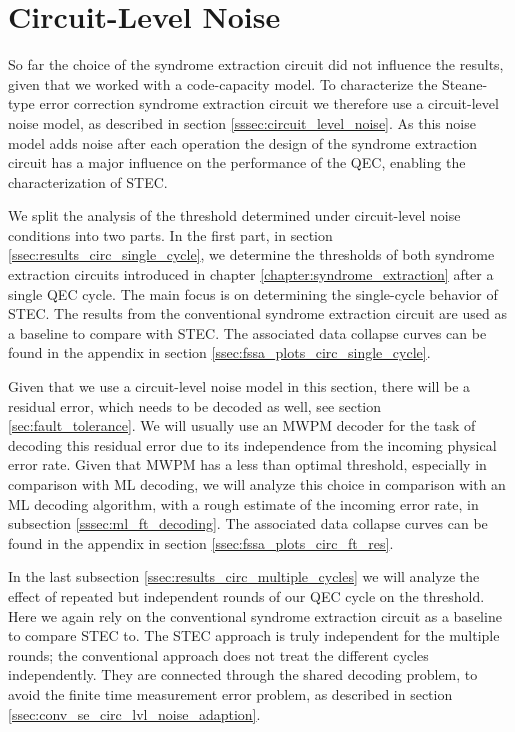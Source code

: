 \section{Circuit-Level Noise}\label{sec:results_circuit_lvl}

So far the choice of the syndrome extraction circuit did not influence the results, given that we worked with a code-capacity model.
To characterize the Steane-type error correction syndrome extraction circuit we therefore use a circuit-level noise model, as described in section \ref{sssec:circuit_level_noise}.
As this noise model adds noise after each operation the design of the syndrome extraction circuit has a major influence on the performance of the QEC, 
enabling the characterization of STEC.

We split the analysis of the threshold determined under circuit-level noise conditions into two parts.
In the first part, in section \ref{ssec:results_circ_single_cycle}, we determine the thresholds of both syndrome extraction circuits introduced in chapter \ref{chapter:syndrome_extraction} after a single QEC cycle.
The main focus is on determining the single-cycle behavior of STEC. 
The results from the conventional syndrome extraction circuit are used as a baseline to compare with STEC. 
The associated data collapse curves can be found in the appendix in section \ref{ssec:fssa_plots_circ_single_cycle}.

Given that we use a circuit-level noise model in this section, there will be a residual error, which needs to be decoded as well, see section \ref{sec:fault_tolerance}.
We will usually use an MWPM decoder for the task of decoding this residual error due to its independence from the incoming physical error rate. 
Given that MWPM has a less than optimal threshold, especially in comparison with ML decoding, we will analyze this choice in comparison with an ML decoding algorithm, 
with a rough estimate of the incoming error rate, in subsection \ref{sssec:ml_ft_decoding}.
The associated data collapse curves can be found in the appendix in section \ref{ssec:fssa_plots_circ_ft_res}.

In the last subsection \ref{ssec:results_circ_multiple_cycles} we will analyze the effect of repeated but independent rounds of our QEC cycle on the threshold. 
Here we again rely on the conventional syndrome extraction circuit as a baseline to compare STEC to.
The STEC approach is truly independent for the multiple rounds; the conventional approach does not treat the different cycles independently. 
They are connected through the shared decoding problem, to avoid the finite time measurement error problem, as described in section \ref{ssec:conv_se_circ_lvl_noise_adaption}.

